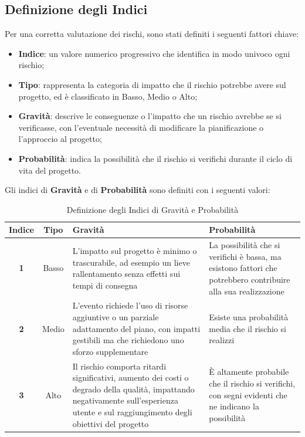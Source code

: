 \documentclass{article}
\begin{document}
    \subsection{Definizione degli Indici}
        Per una corretta valutazione dei rischi, sono stati definiti i seguenti fattori chiave:
        \begin{itemize}
            \item \textbf{Indice}: un valore numerico progressivo che identifica in modo univoco ogni rischio;
            \item \textbf{Tipo}: rappresenta la categoria di impatto che il rischio potrebbe avere sul progetto, ed è classificato in Basso, Medio o Alto;
            \item \textbf{Gravità}: descrive le conseguenze o l'impatto che un rischio avrebbe se si verificasse, con l'eventuale necessità di modificare la pianificazione o l'approccio al progetto;
            \item \textbf{Probabilità}: indica la possibilità che il rischio si verifichi durante il ciclo di vita del progetto.
        \end{itemize}
        Gli indici di \textbf{Gravità} e di \textbf{Probabilità} sono definiti con i seguenti valori:
        \begin{table}[h!]
            \centering
            \begin{tabular}{|c|c|p{6cm}|p{6cm}|}
                \hline
                \textbf{Indice} & \textbf{Tipo} & \textbf{Gravità} & \textbf{Probabilità} \\
                \hline
                \textbf{1} & Basso & L'impatto sul progetto è minimo o trascurabile, ad esempio un lieve rallentamento senza effetti sui tempi di consegna & La possibilità che si verifichi è bassa, ma esistono fattori che potrebbero contribuire alla sua realizzazione \\
                \hline
                \textbf{2} & Medio & L'evento richiede l'uso di risorse aggiuntive o un parziale adattamento del piano, con impatti gestibili ma che richiedono uno sforzo supplementare & Esiste una probabilità media che il rischio si realizzi \\
                \hline
                \textbf{3} & Alto & Il rischio comporta ritardi significativi, aumento dei costi o degrado della qualità, impattando negativamente sull'esperienza utente e sul raggiungimento degli obiettivi del progetto & È altamente probabile che il rischio si verifichi, con segni evidenti che ne indicano la possibilità \\
                \hline
            \end{tabular}
            \caption{Definizione degli Indici di Gravità e Probabilità}
            \label{tab:definizione_indici}
        \end{table}
            
\end{document}
